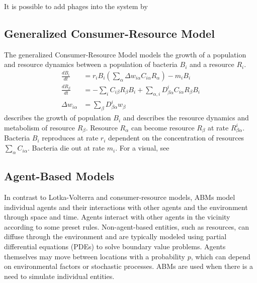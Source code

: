 It is possible to add phages into the system by 
 
\subsection{Generalized Consumer-Resource Model}
The generalized Consumer-Resource Model models the growth of a population and resource dynamics between a population of bacteria ${B}_i$ and a resource ${R}_i$. 
\begin{align}
    \frac{d{B}_i}{dt} &= r_i{B}_i \left(\sum_{\alpha} \Delta w_{i \alpha}C_{i \alpha}R_{\alpha}\right) - m_i {B}_i \label{eq:generalized_consumer_resource_model_1}\\
    \frac{dR_{\beta}}{dt} &= -\sum_i C_{i\beta}R_{\beta}{B_i} + \sum_{\alpha, i}D_{\beta\alpha}^{i}C_{i\alpha}R_{\beta}{B}_i \label{eq:generalized_consumer_resource_model_2}\\
    \Delta w_{i\alpha} &= \sum_{\beta}D_{\beta \alpha}^{i}w_{\beta} \nonumber
\end{align}
 describes the growth of population $B_i$ and  describes the resource dynamics and metabolism of resource $R_\beta$. 
Resource $R_\alpha$ can become resource $R_\beta$ at rate $R_{\beta \alpha}^{i}$. 
Bacteria $B_i$ reproduces at rate $r_i$ dependent on the concentration of resources $\sum_\alpha C_{i\alpha}$. 
Bacteria die out at rate $m_i$. 
For a visual, see 

\subsection{Agent-Based Models}
In contrast to Lotka-Volterra and consumer-resource models, ABMs model individual agents and their interactions with other agents and the environment through space and time.
Agents interact with other agents in the vicinity according to some preset rules. 
Non-agent-based entities, such as resources, can diffuse through the environment and are typically modeled using partial differential equations (PDEs) to solve boundary value problems. 
Agents themselves may move between locations with a probability $p$, which can depend on environmental factors or stochastic processes.  
ABMs are used when there is a need to simulate individual entities. 

